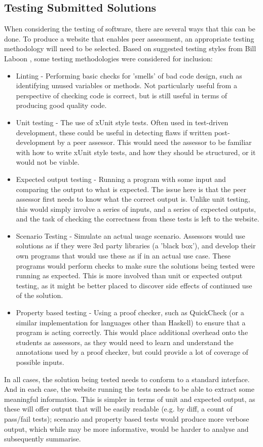 \documentclass[a4paper,11pt]{report}
\begin{document}
\subsection{Testing Submitted Solutions}
\label{subsec:bgtest}
When considering the testing of software, there are several ways that this can be done. To produce a website that enables peer assessment, an appropriate testing methodology will need to be selected. Based on suggested testing styles from Bill Laboon \cite{laboon_friendly_2016}, some testing methodologies were considered for inclusion:
\begin{itemize}
 \item Linting - Performing basic checks for 'smells' of bad code design, such as identifying unused variables or methods. Not particularly useful from a perspective of checking code is correct, but is still useful in terms of producing good quality code.
 \item Unit testing - The use of xUnit style tests. Often used in test-driven development, these could be useful in detecting flaws if written post-development by a peer assessor. This would need the assessor to be familiar with how to write xUnit style tests, and how they should be structured, or it would not be viable.
 \item Expected output testing - Running a program with some input and comparing the output to what is expected. The issue here is that the peer assessor first needs to know what the correct output is. Unlike unit testing, this would simply involve a series of inputs, and a series of expected outputs, and the task of checking the correctness from these tests is left to the website.
 \item Scenario Testing - Simulate an actual usage scenario. Assessors would use solutions as if they were 3rd party libraries (a 'black box'), and develop their own programs that would use these as if in an actual use case. These programs would perform checks to make sure the solutions being tested were running as expected. This is more involved than unit or expected output testing, as it might be better placed to discover side effects of continued use of the solution.
 \item Property based testing - Using a proof checker, such as QuickCheck (or a similar implementation for languages other than Haskell) to ensure that a program is acting correctly. This would place additional overhead onto the students as assessors, as they would need to learn and understand the annotations used by a proof checker, but could provide a lot of coverage of possible inputs.
\end{itemize}
In all cases, the solution being tested needs to conform to a standard interface. And in each case, the website running the tests needs to be able to extract some meaningful information. This is simpler in terms of unit and expected output, as these will offer output that will be easily readable (e.g. by diff, a count of pass/fail tests); scenario and property based tests would produce more verbose output, which while may be more informative, would be harder to analyse and subsequently summarise. 
\end{document}
